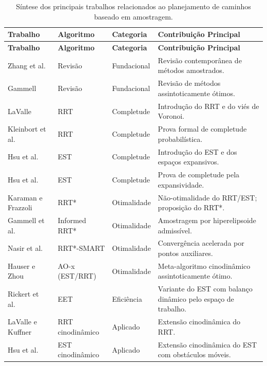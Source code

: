 \begin{center}
\small
\renewcommand{\arraystretch}{1.2}
\begin{longtable}{p{3.2cm} p{2.5cm} p{2.2cm} p{5.1cm}}

    \caption{Síntese dos principais trabalhos relacionados ao planejamento de caminhos baseado em amostragem.}
    \label{tab:trabalhos_relacionados} \\
    \toprule
    \textbf{Trabalho} & \textbf{Algoritmo} & \textbf{Categoria} & \textbf{Contribuição Principal} \\
    \midrule
    \endfirsthead

    \toprule
    \textbf{Trabalho} & \textbf{Algoritmo} & \textbf{Categoria} & \textbf{Contribuição Principal} \\
    \midrule
    \endhead

    \bottomrule
    \endfoot

    \bottomrule
    \endlastfoot

    Zhang et al.~\cite{Zhang_2025} & Revisão & Fundacional & Revisão contemporânea de métodos amostrados. \\
    Gammell~\cite{gammell2021asymptotically} & Revisão & Fundacional & Revisão de métodos assintoticamente ótimos. \\
    \midrule
    LaValle~\cite{LaValle1998RapidlyexploringRT} & RRT & Completude & Introdução do RRT e do viés de Voronoi. \\
    Kleinbort et al.~\cite{kleinbort2022probabilisticcompletenessrrtgeometric} & RRT & Completude & Prova formal de completude probabilística. \\
    Hsu et al.~\cite{hsu1997path} & EST & Completude & Introdução do EST e dos espaços expansivos. \\
    Hsu et al.~\cite{hsu1999path} & EST & Completude & Prova de completude pela expansividade. \\
    \midrule
    Karaman e Frazzoli~\cite{Karaman2011SamplingbasedAF} & RRT* & Otimalidade & Não-otimalidade do RRT/EST; proposição do RRT*. \\
    Gammell et al.~\cite{6942976} & Informed RRT* & Otimalidade & Amostragem por hiperelipsoide admissível. \\
    Nasir et al.~\cite{nasir2013rrtsmart} & RRT*-SMART & Otimalidade & Convergência acelerada por pontos auxiliares. \\
    Hauser e Zhou~\cite{hauser2016asymptotically} & AO-x (EST/RRT) & Otimalidade & Meta-algoritmo cinodinâmico assintoticamente ótimo. \\
    Rickert et al.~\cite{rickert2014balancing} & EET & Eficiência & Variante do EST com balanço dinâmico pelo espaço de trabalho. \\
    \midrule
    LaValle e Kuffner~\cite{LaValle1999RandomizedKP} & RRT cinodinâmico & Aplicado & Extensão cinodinâmica do RRT. \\
    Hsu et al.~\cite{hsu2002randomized} & EST cinodinâmico & Aplicado & Extensão cinodinâmica do EST com obstáculos móveis. \\

\end{longtable}
\end{center}